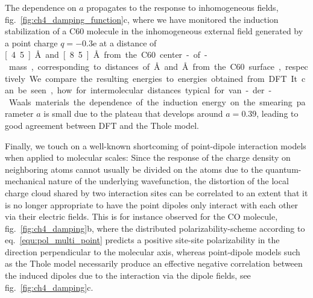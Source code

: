 The dependence on $a$ propagates to the response to inhomogeneous fields, fig.~\ref{fig:ch4_damping_function}c, where we have monitored the induction stabilization of a C60 molecule in the inhomogeneous external field generated by a point charge $q=-0.3\textrm{e}$ at a distance of \unit[4.5]{\AA} and \unit[8.5]{\AA} from the C60 center-of-mass, corresponding to distances of \unit[1]{\AA} and \unit[5]{\AA} from the C60 surface, respectively. We compare the resulting energies to energies obtained from DFT. It can be seen, how for intermolecular distances typical for van-der-Waals materials the dependence of the induction energy on the smearing parameter $a$ is small due to the plateau that develops around $a=0.39$, leading to good agreement between DFT and the Thole model.

Finally, we touch on a well-known shortcoming of point-dipole interaction models when applied to molecular scales: Since the response of the charge density on neighboring atoms cannot usually be divided on the atoms due to the quantum-mechanical nature of the underlying wavefunction, the distortion of the local charge cloud shared by two interaction sites can be correlated to an extent that it is no longer appropriate to have the point dipoles only interact with each other via their electric fields. This is for instance observed for the CO molecule, fig.~\ref{fig:ch4_damping}b, where the distributed polarizability-scheme according to eq.~\ref{equ:pol_multi_point} predicts a positive site-site polarizability in the direction perpendicular to the molecular axis, whereas point-dipole models such as the Thole model necessarily produce an effective negative correlation between the induced dipoles due to the interaction via the dipole fields, see fig.~\ref{fig:ch4_damping}c.


